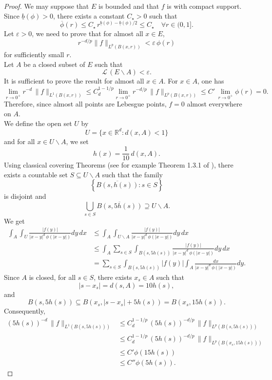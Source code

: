 \documentclass[a4paper,10pt]{article}
\theoremstyle{thmstyleone}%
\theoremstyle{thmstyletwo}%
\theoremstyle{thmstylethree}%
\renewcommand{\epsilon}{\varepsilon}
\begin{document}
\begin{proof}
We may suppose that $E$ is bounded and that $f$ is with compact support. Since $\underline{b}(\phi)>0$, there exists a constant $C_\star>0$ such that 
\[\overline{\phi}(r)\leq C_\star\, r^{\underline{b}(\phi)-\underline{b}(\phi)/2}\leq C_\star\quad\forall r\in(0,1].\]
Let $\varepsilon >0$, we need to prove that for almost all $x\in E$, 
\begin{equation}\label{equa 1 lemme 2 rad}
r^{-d/p}\|f\|_{L^p(B(x,r))}<\varepsilon\,\phi(r)
\end{equation}
for sufficiently small $r$.
\\Let $A$ be a closed subset of $E$ such that
\[\mathcal{L}\,(E\backslash A)<\epsilon.\]
It is sufficient to prove the result for almost all $x\in A$. For $x\in A$, one has
\[\lim_{r\rightarrow 0^+}r^{-d}\,\|f\|_{L^1(B(x,r))}\leq C_d^{1-1/p}\lim_{r\rightarrow 0^+}r^{-d/p}\,\|f\|_{L^p(B(x,r))}\leq C'\,\lim_{r\rightarrow 0^+}\phi(r)=0.\]
Therefore, since almost all points are Lebesgue points, $f=0$ almost everywhere on $A$.
\smallskip\\We define the open set $U$ by
\[U=\{x\in\mathbb{R}^d:d(x,A)<1\}\]
and for all $x\in U\backslash A$, we set
\[h(x)=\frac{1}{10}\,d(x,A).\]
Using classical covering Theorems (see for example Theorem 1.3.1 of \cite{Ziemer:89}), there exists a countable set $S\subseteq U\backslash A$ such that the family
\[\left\{\overline{B(s,h(s))}:s\in S\right\}\]
is disjoint and 
\[\bigcup_{s\in S} \overline{B(s,5h(s))}\supseteq U\backslash A.\]
We get
\begin{align*}
\int_A\int_U\frac{|f(y)|}{|x-y|^{d}\,\phi(|x-y|)}dy\,dx&\leq \int_A\int_{U\backslash A}\frac{|f(y)|}{|x-y|^{d}\,\phi(|x-y|)}dy\,dx\\
&\leq \int_A\sum_{s\in S}\int_{B(s,5h(s))}\frac{|f(y)|}{|x-y|^{d}\,\phi(|x-y|)}dy\,dx\\
&= \sum_{s\in S}\int_{B(s,5h(s))}|f(y)|\int_A\frac{dx}{|x-y|^{d}\,\phi(|x-y|)}dy.
\end{align*}
Since $A$ is closed, for all $s\in S$,  there exists $x_s\in A$ such that
\[|s-x_s|=d(s,A)=10h(s),\]
and
\[B(s,5h(s))\subseteq B(x_s,|s-x_s|+5h(s))=B(x_s,15 h(s)).\]
Consequently,
\begin{align*}
(5h(s))^{-d}\,\|f\|_{L^1(B(s,5h(s)))}&\leq C_d^{1-1/p}\,(5h(s))^{-d/p}\,\|f\|_{L^p(B(s,5h(s)))}\\&\leq C_d^{1-1/p}\,(5h(s))^{-d/p}\,\|f\|_{L^p(B(x_s,15h(s)))}\\
&\leq C' \phi(15h(s))\\
&\leq C''\phi(5h(s)).

\end{align*}
\end{proof}
\end{document}
